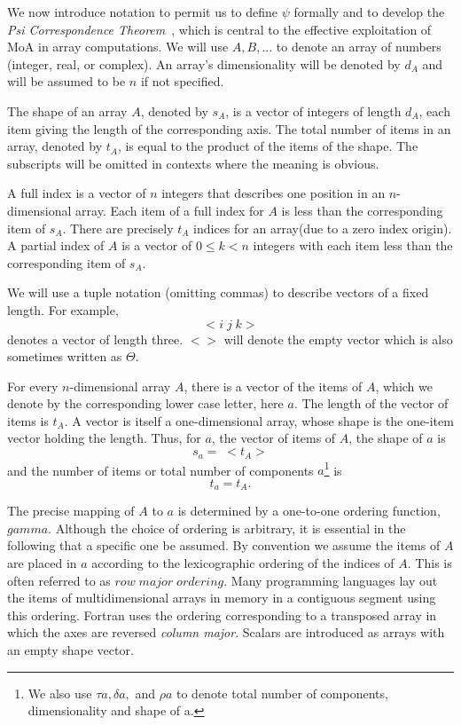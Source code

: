 	We now introduce notation to permit us to define $\psi$ formally and to develop the
{\em Psi Correspondence Theorem}~\cite{muljen94}, which is central to the effective exploitation of MoA in array
computations. We will use $A, B, ...$ to denote an array of numbers (integer, real, or complex).
An array's dimensionality will be denoted by $d_A$ and will be assumed to 
be $n$ if not specified.

	The shape of an array $A$, denoted by $s_A$, is a vector of integers of length $d_A$,
each item giving the length of the corresponding axis. The total number of items in an
array, denoted by $t_A$, is equal to the product of the items of the shape. The subscripts
will be omitted in contexts where the meaning is obvious.

A full index is a vector of $n$ integers that describes one position 
in an $n$-dimensional
array. Each item of a full index for $A$ is less than the corresponding item of
$s_A$. There are precisely $t_A$ indices for an array(due to a
zero index origin). A partial index of $A$ is a vector of $0 \leq  k < n $
integers with each item less than the corresponding item of $s_A$.

	We will use a tuple notation (omitting commas) to describe vectors of a fixed length.
For example,
\[                  <i \; j \; k> \]
denotes a vector of length three. $<>$ will denote the empty vector which is 
also sometimes written as $\Theta$.

	For every $n$-dimensional array $A$, there is a vector of the items of $A$,
which we denote by the corresponding lower case letter, here $a$. The length of the vector of
items is $t_A$. A vector is itself a one-dimensional array, whose shape is the one-item
vector holding the length. Thus, for $a$, the vector of items of $A$, the
shape of $a$ is
\[                     s_a =  \; < t_A> \]
and the number of items or total number of components
$a$\footnote{We also use $\tau a , \delta a,$ and $\rho a$ to denote
total number of components, dimensionality and shape of a. } is
\[                    t_a =  t_A . \]

	The precise mapping of $A$ to $a$ is determined by a one-to-one 
ordering function, $gamma$.  Although the choice of ordering is arbitrary, it is 
essential in the following that a specific one be assumed. By convention 
we assume the items of $A$ are placed in $a$ according to the lexicographic 
ordering of the indices of $A$. This is often referred to 
as $row \; major \; ordering$. 
Many programming languages lay out the items of multidimensional
arrays in memory in a contiguous segment using this ordering. 
Fortran uses the ordering corresponding to a transposed array in which the 
axes are reversed {\em column major}. Scalars are introduced as arrays with an empty shape vector.

